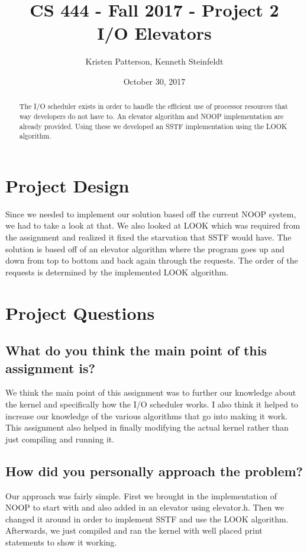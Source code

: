 \documentclass[10pt,letterpaper,onecolumn,draftclsnofoot]{IEEEtran}
\begin{document}
\begin{titlepage}

	\title{CS 444 - Fall 2017 - Project 2 \\ I/O Elevators}
	\author{Kristen Patterson, Kenneth Steinfeldt}
	\date{October 30, 2017}
	\maketitle
	\vspace{4cm}
	\begin{abstract}
		\noindent 
			\noindent
			The I/O scheduler exists in order to handle the efficient use of processor resources that way developers do not have to. An elevator algorithm and NOOP implementation are already provided. Using these we developed an SSTF implementation using the LOOK algorithm.
	\end{abstract}
\end{titlepage}

\section{Project Design}
Since we needed to implement our solution based off the current NOOP system, we had to take a look at that. We also looked at LOOK which was required from the assignment and realized it fixed the starvation that SSTF would have. The solution is based off of an elevator algorithm where the program goes up and down from top to bottom and back again through the requests. The order of the requests is determined by the implemented LOOK algorithm.

\section{Project Questions}
\subsection{What do you think the main point of this assignment is?}
We think the main point of this assignment was to further our knowledge about the kernel and specifically how the I/O scheduler works. I also think it helped to increase our knowledge of the various algorithms that go into making it work. This assignment also helped in finally modifying the actual kernel rather than just compiling and running it.

\subsection{How did you personally approach the problem?}
Our approach was fairly simple. First we brought in the implementation of NOOP to start with and also added in an elevator using elevator.h. Then we changed it around in order to implement SSTF and use the LOOK algorithm. Afterwards, we just compiled and ran the kernel with well placed print statements to show it working.
\end{document}
